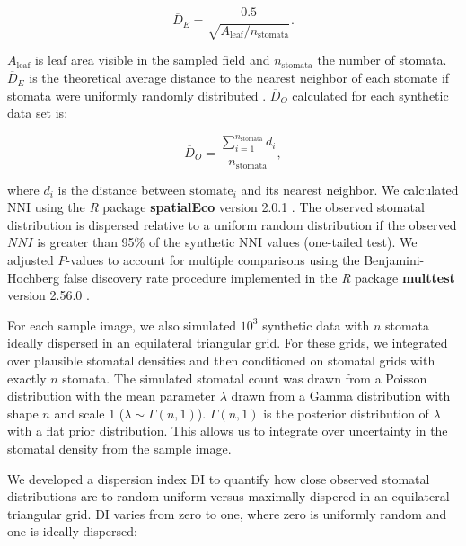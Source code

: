 \documentclass[webpdf,large,modern,unnumsec,namedate]{oup-authoring-template}
\begin{document}
\begin{equation}\label{eq:emd}
  \overline{D}_E = \frac{0.5}{\sqrt{A_\text{leaf} / n_\text{stomata}}}.
\end{equation}

\noindent \(A_\text{leaf}\) is leaf area visible in the sampled field
and \(n_\text{stomata}\) the number of stomata. \(\overline{D}_E\) is
the theoretical average distance to the nearest neighbor of each stomate
if stomata were uniformly randomly distributed
\citep{clark_distance_1954}. \(\overline{D}_O\) calculated for each
synthetic data set is:

\begin{equation}\label{eq:omd}
  \overline{D}_O = \frac{\sum_{i=1}^{n_\text{stomata}}d_i}{n_\text{stomata}},
\end{equation}

\noindent where \(d_i\) is the distance between \(\text{stomate}_i\) and
its nearest neighbor. We calculated \(\mathrm{NNI}\) using the \emph{R}
package \textbf{spatialEco} version 2.0.1 \citep{evans_spatialeco_2023}.
The observed stomatal distribution is dispersed relative to a uniform
random distribution if the observed \(NNI\) is greater than 95\% of the
synthetic \(\mathrm{NNI}\) values (one-tailed test). We adjusted
\(P\)-values to account for multiple comparisons using the
Benjamini-Hochberg \citep{benjamini_controlling_1995} false discovery
rate procedure implemented in the \emph{R} package \textbf{multtest}
version 2.56.0 \citep{wong_multiple_2005}.

For each sample image, we also simulated \(10^3\) synthetic data with
\(n\) stomata ideally dispersed in an equilateral triangular grid. For
these grids, we integrated over plausible stomatal densities and then
conditioned on stomatal grids with exactly \(n\) stomata. The simulated
stomatal count was drawn from a Poisson distribution with the mean
parameter \(\lambda\) drawn from a Gamma distribution with shape \(n\)
and scale 1 (\(\lambda \sim \Gamma(n, 1)\)). \(\Gamma(n, 1)\) is the
posterior distribution of \(\lambda\) with a flat prior distribution.
This allows us to integrate over uncertainty in the stomatal density
from the sample image.

We developed a dispersion index \(\mathrm{DI}\) to quantify how close
observed stomatal distributions are to random uniform versus maximally
dispered in an equilateral triangular grid. \(\mathrm{DI}\) varies from
zero to one, where zero is uniformly random and one is ideally
dispersed:
\end{document}
